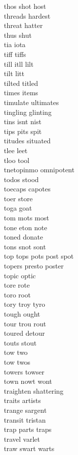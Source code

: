 thos shot host\\
threads hardest\\
threat hatter\\
thus shut\\
tia iota \\
tiff tiffs \\
till itll lilt\\
tilt litt\\
tilted titled\\
times items\\
timulate ultimates \\
tingling glinting\\
tins isnt nist\\
tips pits spit\\
titudes situated \\
tlee leet\\
tloo tool\\
tnetopinmo omnipotent\\
todos stood\\
toecaps capotes\\
toer store \\
toga goat\\
tom mots most \\
tone eton note\\
toned donate \\
tons snot sont\\
top tops pots post spot \\
topers presto poster\\
topic optic\\
tore rote\\
toro root\\
tory troy tyro\\
tough ought\\
tour trou rout\\
toured detour\\
touts stout\\
tow two\\
tow twos \\
towers towser\\
town nowt wont\\
traighten shattering \\
traits artists \\
trange sargent \\
transit tristan\\
trap parts traps \\
travel varlet\\
traw swart warts \\
